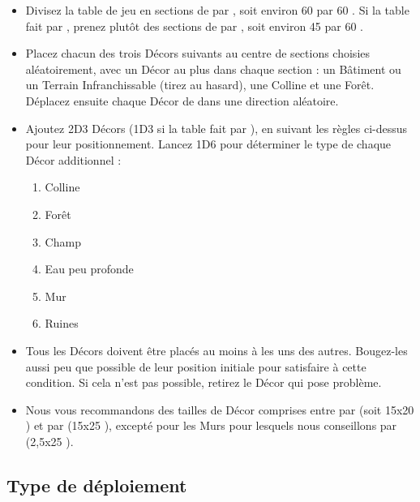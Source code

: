 \begin{itemize}[label={\textbullet}]
\item Divisez la table de jeu en sections de  par , soit environ 60 {\centi\meter} par 60 {\centi\meter}. Si la table fait  par , prenez plutôt des sections de  par , soit environ 45 {\centi\meter} par 60 {\centi\meter}.

\item Placez chacun des trois Décors suivants au centre de sections choisies aléatoirement, avec un Décor au plus dans chaque section : un Bâtiment ou un Terrain Infranchissable (tirez au hasard), une Colline et une Forêt. Déplacez ensuite chaque Décor de  dans une direction aléatoire.

\item Ajoutez 2D3 Décors (1D3 si la table fait  par ), en suivant les règles ci-dessus pour leur positionnement. Lancez 1D6 pour déterminer le type de chaque Décor additionnel :
\begin{enumerate}
\item Colline
\item Forêt
\item Champ
\item Eau peu profonde
\item Mur
\item Ruines
\end{enumerate}

\item Tous les Décors doivent être placés au moins à  les uns des autres. Bougez-les aussi peu que possible de leur position initiale pour satisfaire à cette condition. Si cela n'est pas possible, retirez le Décor qui pose problème.

\item Nous vous recommandons des tailles de Décor comprises entre  par  (soit 15x20 {\centi\meter}) et  par  (15x25 {\centi\meter}), excepté pour les Murs pour lesquels nous conseillons  par  (2,5x25 {\centi\meter}).
\end{itemize}

\newpage
\subsection{Type de déploiement}

